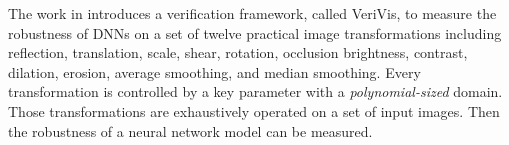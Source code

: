 The work in \cite{pei2017towards} introduces a verification framework, called VeriVis, to measure the robustness of DNNs on 
%
%
a set of twelve practical image transformations including reflection, translation, scale, shear, rotation, occlusion brightness, contrast, dilation, erosion, average smoothing, and median smoothing. Every transformation is controlled by a key parameter with a \emph{polynomial-sized} domain. Those transformations are exhaustively operated on a set of input images. Then the robustness of a neural network model can be measured.
